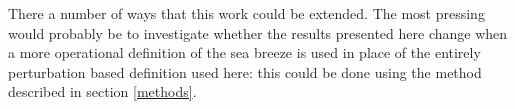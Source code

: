 \documentclass[alpha-refs]{wiley-article}
\begin{document}
There a number of ways that this work could be extended. The most pressing would probably be to investigate whether the results presented here change when a more operational definition of the sea breeze is used in place of the entirely perturbation based definition used here: this could be done using the method described in section \ref{methods}.


\end{document}
